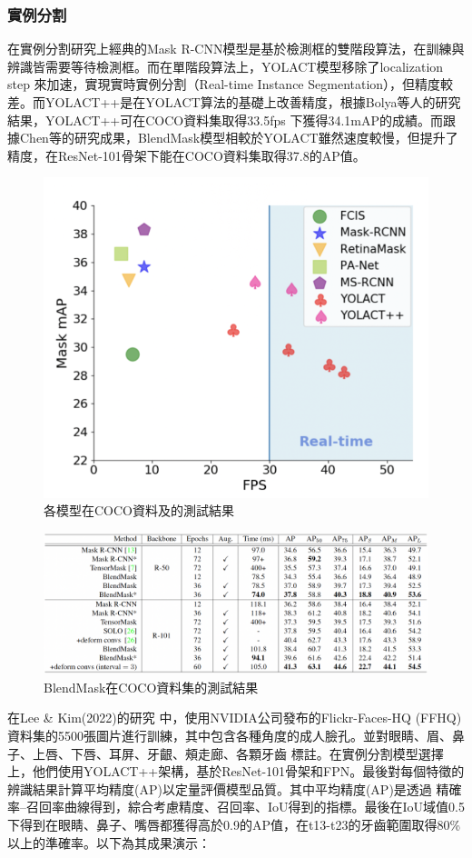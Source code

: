 \subsubsection{實例分割}
在實例分割研究上經典的Mask R-CNN模型是基於檢測框的雙階段算法，在訓練與辨識皆需要等待檢測框。而在單階段算法上，YOLACT模型移除了localization step 來加速，實現實時實例分割（Real-time Instance Segmentation），但精度較差。而YOLACT++是在YOLACT算法的基礎上改善精度，根據Bolya等人的研究結果，YOLACT++可在COCO資料集取得33.5fps 下獲得34.1mAP的成績。而跟據Chen等的研究成果，BlendMask模型相較於YOLACT雖然速度較慢，但提升了精度，在ResNet-101骨架下能在COCO資料集取得37.8的AP值。

\begin{figure}[H]
  \centering
\includegraphics[width=.5\textwidth]{paste_src/2023-02-06-20-56-24.png}

  \caption{各模型在COCO資料及的測試結果}

\end{figure}


\begin{figure}[H]
\centering
\includegraphics[width=1\textwidth]{paste_src/2023-02-06-20-58-26.png}\caption{BlendMask在COCO資料集的測試結果}
\label{}
\end{figure}



在Lee \& Kim(2022)的研究 中，使用NVIDIA公司發布的Flickr-Faces-HQ (FFHQ)資料集的5500張圖片進行訓練，其中包含各種角度的成人臉孔。並對眼睛、眉、鼻子、上唇、下唇、耳屏、牙齦、頰走廊、各顆牙齒  標註。在實例分割模型選擇上，他們使用YOLACT++架構，基於ResNet-101骨架和FPN。最後對每個特徵的辨識結果計算平均精度(AP)以定量評價模型品質。其中平均精度(AP)是透過 精確率–召回率曲線得到，綜合考慮精度、召回率、IoU得到的指標。最後在IoU域值0.5下得到在眼睛、鼻子、嘴唇都獲得高於0.9的AP值，在t13-t23的牙齒範圍取得80\%以上的準確率。以下為其成果演示：



